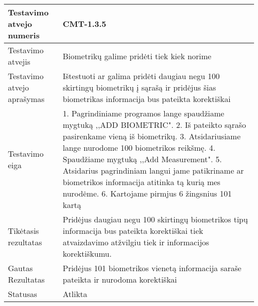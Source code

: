 \documentclass[oneside]{VUMIFPSkursinis}
\begin{document}
\begin{center}
    \begin{tabular}{ |p{5cm}|p{13cm}|}
    \hline
        Testavimo atvejo numeris & CMT-1.3.5  \\ \hline
        Testavimo atvejis & Biometrikų galime pridėti tiek kiek norime  \\ \hline
        Testavimo atvejo aprašymas & Ištestuoti ar galima pridėti daugiau negu 100 skirtingų biometrikų į sąrašą ir pridėjus šias biometrikas informacija bus pateikta korektiškai \\ \hline
        Testavimo eiga &  1. Pagrindiniame programos lange spaudžiame mygtuką ,,ADD BIOMETRIC". 
				2. Iš pateikto sąrašo pasirenkame vieną iš biometrikų. 
				3. Atsidariusiame lange nurodome 100 biometrikos reikšmę.
				4. Spaudžiame mygtuką ,,Add Measurement".
				5. Atsidarius pagrindiniam langui jame patikriname ar biometrikos informacija atitinka tą kurią mes nurodėme.
				6. Kartojame pirmjus 6 žingsnius 101 kartą\\ \hline
        Tikėtasis rezultatas & Pridėjus daugiau negu 100 skirtingų biometrikos tipų informacija bus pateikta korektiškai tiek atvaizdavimo atžvilgiu tiek ir informacijos korektiškumu.\\ \hline
        Gautas Rezultatas & Pridėjus 101 biometrikos vienetą informacija saraše pateikta ir nurodoma korektiškai  \\ \hline
        Statusas & Atlikta  \\ \hline
    \hline
    \end{tabular}
\end{center}
\end{document}
